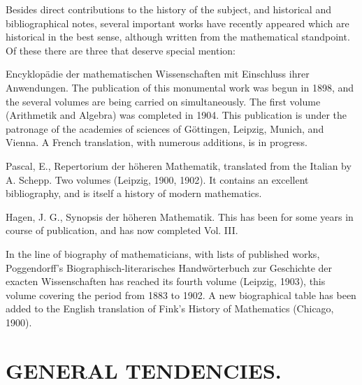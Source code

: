 \documentclass[oneside]{book}
\begin{document}
Besides direct contributions to the history of the subject, and
historical and bibliographical notes, several important works have
recently appeared which are historical in the best sense, although
written from the mathematical standpoint. Of these there are three
that deserve special mention:

\bigskip

Encyklop\"adie der mathematischen Wissenschaften mit Einschluss
ihrer Anwendungen. The publication of this monumental work was begun
in 1898, and the several volumes are being carried on
simultaneously. The first volume (Arithmetik and Algebra) was
completed in 1904. This publication is under the patronage of the
academies of sciences of G\"ottingen, Leipzig, Munich, and Vienna. A
French translation, with numerous additions, is in progress.

Pascal, E., Repertorium der h\"oheren Mathematik, translated from
the Italian by A. Schepp. Two volumes (Leipzig, 1900, 1902). It
contains an excellent bibliography, and is itself a history of
modern mathematics.

Hagen, J. G., Synopsis der h\"oheren Mathematik. This has been for
some years in course of publication, and has now completed Vol. III.

\bigskip

In the line of biography of mathematicians, with lists of published
works, Poggendorff's Biographisch-literarisches Handw\"orterbuch zur
Geschichte der exacten Wissenschaften has reached its fourth volume
(Leipzig, 1903), this volume covering the period from 1883 to
1902. A new biographical table has been added to the English
translation of Fink's History of Mathematics (Chicago, 1900).

\chapter{GENERAL TENDENCIES.}
\end{document}
